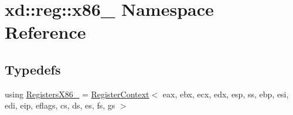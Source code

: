 \hypertarget{namespacexd_1_1reg_1_1x86__32}{}\section{xd\+:\+:reg\+:\+:x86\+\_ Namespace Reference}
\label{namespacexd_1_1reg_1_1x86__32}
\subsection*{Typedefs}
\begin{DoxyCompactItemize}
\item 
using \mbox{\hyperlink{namespacexd_1_1reg_1_1x86__32_a28d948c5cde56fbf4f6ea71cea3d595b}{Registers\+X86\+\_}} = \mbox{\hyperlink{namespacexd_1_1reg_ab6608c02ef554f7a9a48519600fb6707}{Register\+Context}}$<$ eax, ebx, ecx, edx, esp, ss, ebp, esi, edi, eip, eflags, cs, ds, es, fs, gs $>$
\end{DoxyCompactItemize}
